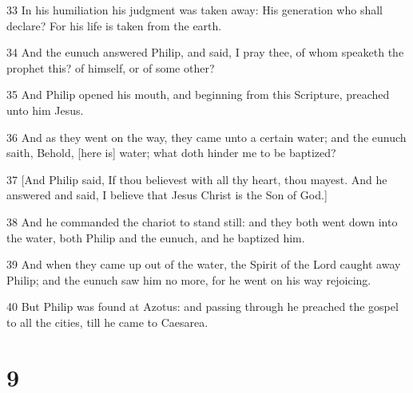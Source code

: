 \par 33 In his humiliation his judgment was taken away: His generation who shall declare? For his life is taken from the earth.
\par 34 And the eunuch answered Philip, and said, I pray thee, of whom speaketh the prophet this? of himself, or of some other?
\par 35 And Philip opened his mouth, and beginning from this Scripture, preached unto him Jesus.
\par 36 And as they went on the way, they came unto a certain water; and the eunuch saith, Behold, [here is] water; what doth hinder me to be baptized?
\par 37 [And Philip said, If thou believest with all thy heart, thou mayest. And he answered and said, I believe that Jesus Christ is the Son of God.]
\par 38 And he commanded the chariot to stand still: and they both went down into the water, both Philip and the eunuch, and he baptized him.
\par 39 And when they came up out of the water, the Spirit of the Lord caught away Philip; and the eunuch saw him no more, for he went on his way rejoicing.
\par 40 But Philip was found at Azotus: and passing through he preached the gospel to all the cities, till he came to Caesarea.

\chapter{9}


